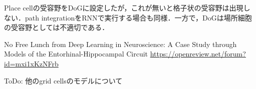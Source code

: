 Place cellの受容野をDoGに設定したが，これが無いと格子状の受容野は出現しない．path integrationをRNNで実行する場合も同様．一方で，DoGは場所細胞の受容野としては不適切である．

No Free Lunch from Deep Learning in Neuroscience: A Case Study through Models of the Entorhinal-Hippocampal Circuit 
\url{https://openreview.net/forum?id=mxi1xKzNFrb}

ToDo: 他のgrid cellsのモデルについて
